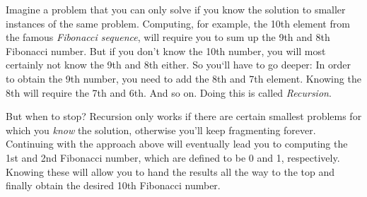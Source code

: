 
Imagine a problem that you can only solve if you know the solution to
smaller instances of the same problem. Computing, for example, the
10th element from the famous \emph{Fibonacci sequence}, will require
you to sum up the 9th and 8th Fibonacci number. But if you don't know
the 10th number, you will most certainly not know the 9th and 8th
either. So you`ll have to go deeper: In order to obtain the 9th
number, you need to add the 8th and 7th element. Knowing the 8th will
require the 7th and 6th. And so on. Doing this is
called \emph{Recursion}.

But when to stop? Recursion only works if there are certain smallest
problems for which you \emph{know} the solution, otherwise you'll keep
fragmenting forever. Continuing with the approach above will
eventually lead you to computing the 1st and 2nd Fibonacci number,
which are defined to be 0 and 1, respectively. Knowing these will
allow you to hand the results all the way to the top and finally
obtain the desired 10th Fibonacci number.
